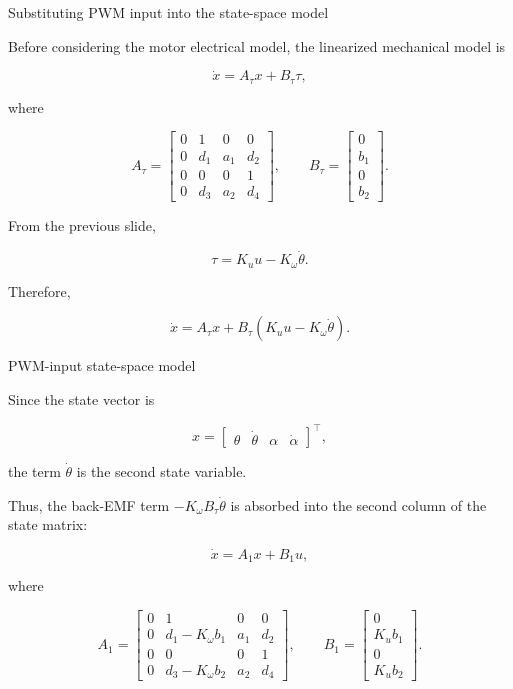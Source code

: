 \documentclass[aspectratio=169]{beamer}
\begin{document}
\begin{frame}{Substituting PWM input into the state-space model}

Before considering the motor electrical model, the linearized mechanical model is

\[
\dot{x}
=
A_{\tau}x+B_{\tau}\tau ,
\]

where

\[
A_{\tau}
=
\begin{bmatrix}
0 & 1 & 0 & 0 \\
0 & d_1 & a_1 & d_2 \\
0 & 0 & 0 & 1 \\
0 & d_3 & a_2 & d_4
\end{bmatrix},
\qquad
B_{\tau}
=
\begin{bmatrix}
0 \\ b_1 \\ 0 \\ b_2
\end{bmatrix}.
\]

From the previous slide,

\[
\tau=K_u u-K_\omega\dot{\theta}.
\]

Therefore,

\[
\dot{x}
=
A_{\tau}x
+
B_{\tau}
\left(
K_u u-K_\omega\dot{\theta}
\right).
\]

\end{frame}


\begin{frame}{PWM-input state-space model}

Since the state vector is

\[
x=
\begin{bmatrix}
\theta & \dot{\theta} & \alpha & \dot{\alpha}
\end{bmatrix}^{\top},
\]

the term \(\dot{\theta}\) is the second state variable.


Thus, the back-EMF term \(-K_\omega B_{\tau}\dot{\theta}\) is absorbed into the second column of the state matrix:

\[
\dot{x}
=
A_1x+B_1u,
\]

where

\[
A_1
=
\begin{bmatrix}
0 & 1 & 0 & 0 \\
0 & d_1-K_\omega b_1 & a_1 & d_2 \\
0 & 0 & 0 & 1 \\
0 & d_3-K_\omega b_2 & a_2 & d_4
\end{bmatrix},
\qquad
B_1
=
\begin{bmatrix}
0 \\ K_u b_1 \\ 0 \\ K_u b_2
\end{bmatrix}.
\]


\end{frame}
\end{document}
